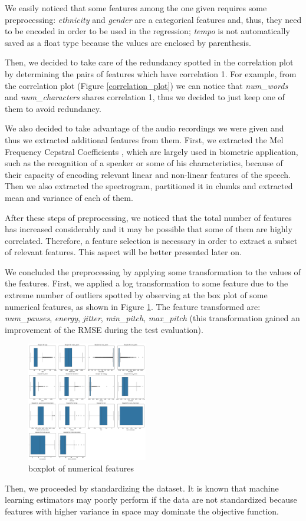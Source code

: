 We easily noticed that some features among the one given requires some preprocessing: \emph{ethnicity} and \emph{gender} are a categorical features and, thus, they need to be encoded in order to be used in the regression; \emph{tempo} is not automatically saved as a float type because the values are enclosed by parenthesis.

Then, we decided to take care of the redundancy spotted in the correlation plot by determining the pairs of features which have correlation 1. 
For example, from the correlation plot (Figure \eqref{correlation_plot}) we can notice that \textit{num\_words} and \textit{num\_characters} shares correlation 1, thus we decided to just keep one of them to avoid redundancy.

We also decided to take advantage of the audio recordings we were given and thus we extracted additional features from them. First, we extracted the Mel Frequency Cepstral Coefficients \cite{MFCCcoefs}, which are largely used in biometric application, such as the recognition of a speaker or some of his characteristics, because of their capacity of encoding relevant linear and non-linear features of the speech. Then we also extracted the spectrogram, partitioned it in chunks and extracted mean and variance of each of them.

After these steps of preprocessing, we noticed that the total number of features has increased considerably and it may be possible that some of them are highly correlated. Therefore, a feature selection is necessary in order to extract a subset of relevant features. This aspect will be better presented later on.

We concluded the preprocessing by applying some transformation to the values of the features.
First, we applied a log transformation to some feature due to the extreme number of outliers spotted by observing at the box plot of some numerical features, as shown in Figure \ref{box}. The feature transformed are: \textit{num\_pauses}, \textit{energy}, \textit{jitter}, \textit{min\_pitch}, \textit{max\_pitch} (this transformation gained an improvement of the RMSE during the test evaluation).

\begin{figure}
    \includegraphics[width = 0.47\textwidth]{img/boxplot.pdf}
    \caption{boxplot of numerical features}
    \label{box}
\end{figure}

Then, we proceeded by standardizing the dataset. It is known that machine learning estimators may poorly perform if the data are not standardized because features with higher variance in space may dominate the objective function.
 
